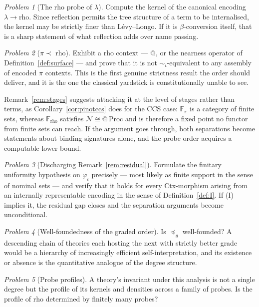 \documentclass[11pt,a4paper]{article}
\theoremstyle{definition}
\theoremstyle{plain}
\theoremstyle{remark}
\newtheorem{problem}{Problem}
\begin{document}
\begin{problem}[The rho probe of $\lambda$]
Compute the kernel of the canonical encoding $\lambda \to \text{rho}$. Since
reflection permits the tree structure of a term to be internalised, the kernel may be
strictly finer than L\'evy--Longo. If it is $\beta$-conversion itself, that is a
sharp statement of what reflection adds over name passing.
\end{problem}

\begin{problem}[$\pi \prec$ rho]
\label{prob:pirho}
Exhibit a rho context --- $@$, or the nearness operator of
Definition~\ref{def:surface} --- and
prove that it is not $\sim_\iota$-equivalent to any assembly of encoded $\pi$
contexts. This is the first genuine strictness result the order should deliver, and
it is the one the classical yardstick is constitutionally unable to see.

Remark~\ref{rem:stages} suggests attacking it at the level of stages rather than
terms, as Corollary~\ref{cor:pinotccs} does for the CCS case: $\mathbb{F}_\pi$ is a
category of finite sets, whereas $\mathbb{F}_{\mathrm{rho}}$ satisfies
$\mathcal{N} \cong @\,\mathrm{Proc}$ and is therefore a fixed point no functor from
finite sets can reach. If the argument goes through, both separations become
statements about binding signatures alone, and the probe order acquires a
computable lower bound.
\end{problem}

\begin{problem}[Discharging Remark~\ref{rem:residual}]
Formulate the finitary uniformity hypothesis on $\varphi_\iota$ precisely --- most
likely as finite support in the sense of nominal sets --- and verify that it holds
for every Ctx-morphism arising from an internally representable encoding in the
sense of Definition~\ref{def:I}. If (I) implies it, the residual gap closes and the
separation arguments become unconditional.
\end{problem}

\begin{problem}[Well-foundedness of the graded order]
Is $\preceq_g$ well-founded? A descending chain of theories each hosting the next
with strictly better grade would be a hierarchy of increasingly efficient
self-interpretation, and its existence or absence is the quantitative analogue of the
degree structure.
\end{problem}

\begin{problem}[Probe profiles]
A theory's invariant under this analysis is not a single degree but the profile of
its kernels and densities across a family of probes. Is the profile of rho determined
by finitely many probes?
\end{problem}
\end{document}
